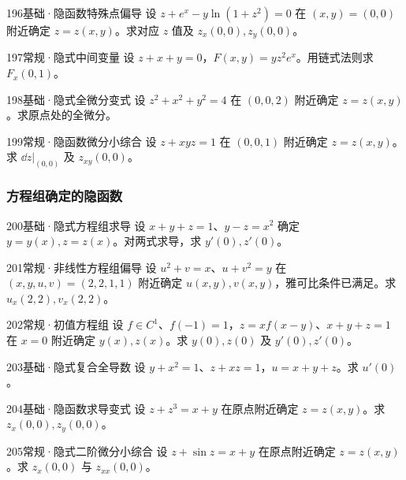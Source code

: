 \begin{exercise}{196}{基础·隐函数特殊点偏导}
设 $z+e^x-y\ln(1+z^2)=0$ 在 $(x,y)=(0,0)$ 附近确定 $z=z(x,y)$。求对应 $z$ 值及 $z_x(0,0),z_y(0,0)$。
\end{exercise}
\begin{exercise}{197}{常规·隐式中间变量}
设 $z+x+y=0$，$F(x,y)=yz^2e^x$。用链式法则求 $F_x(0,1)$。
\end{exercise}
\begin{exercise}{198}{基础·隐式全微分变式}
设 $z^2+x^2+y^2=4$ 在 $(0,0,2)$ 附近确定 $z=z(x,y)$。求原点处的全微分。
\end{exercise}
\begin{exercise}{199}{常规·隐函数微分小综合}
设 $z+xyz=1$ 在 $(0,0,1)$ 附近确定 $z=z(x,y)$。求 $\dd z|_{(0,0)}$ 及 $z_{xy}(0,0)$。
\end{exercise}
\subsubsection{方程组确定的隐函数}
\begin{exercise}{200}{基础·隐式方程组求导}
设 $x+y+z=1$、$y-z=x^2$ 确定 $y=y(x),z=z(x)$。对两式求导，求 $y'(0),z'(0)$。
\end{exercise}
\begin{exercise}{201}{常规·非线性方程组偏导}
设 $u^2+v=x$、$u+v^2=y$ 在 $(x,y,u,v)=(2,2,1,1)$ 附近确定 $u(x,y),v(x,y)$，雅可比条件已满足。求 $u_x(2,2),v_x(2,2)$。
\end{exercise}
\begin{exercise}{202}{常规·初值方程组}
设 $f\in C^1$、$f(-1)=1$，$z=xf(x-y)$、$x+y+z=1$ 在 $x=0$ 附近确定 $y(x),z(x)$。求 $y(0),z(0)$ 及 $y'(0),z'(0)$。
\end{exercise}
\begin{exercise}{203}{基础·隐式复合全导数}
设 $y+x^2=1$、$z+xz=1$，$u=x+y+z$。求 $u'(0)$。
\end{exercise}
\begin{exercise}{204}{基础·隐函数求导变式}
设 $z+z^3=x+y$ 在原点附近确定 $z=z(x,y)$。求 $z_x(0,0),z_y(0,0)$。
\end{exercise}
\begin{exercise}{205}{常规·隐式二阶微分小综合}
设 $z+\sin z=x+y$ 在原点附近确定 $z=z(x,y)$。求 $z_x(0,0)$ 与 $z_{xx}(0,0)$。
\end{exercise}

